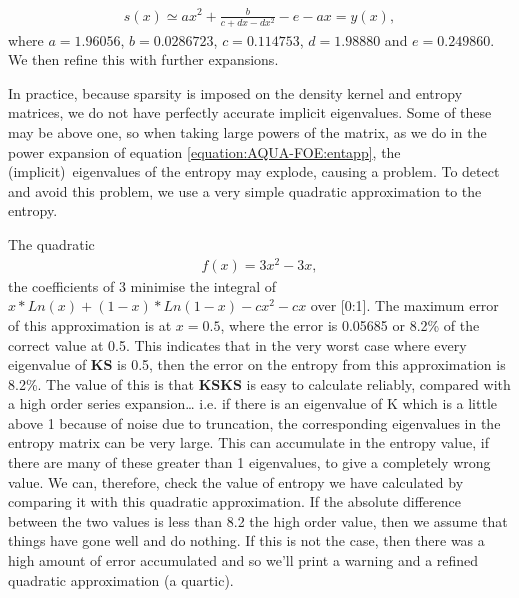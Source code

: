\documentclass[letterpaper,10pt,english]{sphinxmanual}
\begin{document}
\label{\detokenize{AQUA-FOE:equation-entapp}}\begin{equation}\label{equation:AQUA-FOE:entapp}
\begin{split}s(x) \simeq ax^2 + \frac{b}{c + dx -dx^2} - e -ax =y(x),\end{split}
\end{equation}
where \(a=1.96056\), \(b=0.0286723\), \(c=0.114753\),
\(d=1.98880\) and \(e=0.249860\). We then refine this with
further expansions.

In practice, because sparsity is imposed on the density kernel and
entropy matrices, we do not have perfectly accurate implicit
eigenvalues. Some of these may be above one, so when taking large powers
of the matrix, as we do in the power expansion of equation \eqref{equation:AQUA-FOE:entapp},
the (implicit) eigenvalues of the entropy may explode, causing a
problem. To detect and avoid this problem, we use a very simple
quadratic approximation to the entropy.

The quadratic
\begin{equation*}
\begin{split}f(x) = 3x^2 - 3x,\end{split}
\end{equation*}
the coefficients of 3 minimise the integral of
\(x*Ln(x) + (1-x)*Ln(1-x) - cx^2 - cx\) over {[}0:1{]}. The maximum
error of this approximation is at \(x=0.5\), where the error is
0.05685 or 8.2\% of the correct value at 0.5. This indicates that in the
very worst case where every eigenvalue of \(\mathbf{KS}\) is 0.5,
then the error on the entropy from this approximation is 8.2\%. The value
of this is that \(\mathbf{KSKS}\) is easy to calculate reliably,
compared with a high order series expansion… i.e. if there is an
eigenvalue of K which is a little above 1 because of noise due to
truncation, the corresponding eigenvalues in the entropy matrix can be
very large. This can accumulate in the entropy value, if there are many
of these greater than 1 eigenvalues, to give a completely wrong value.
We can, therefore, check the value of entropy we have calculated by
comparing it with this quadratic approximation. If the absolute
difference between the two values is less than 8.2 the high order value,
then we assume that things have gone well and do nothing. If this is not
the case, then there was a high amount of error accumulated and so we’ll
print a warning and a refined quadratic approximation (a quartic).
\end{document}
